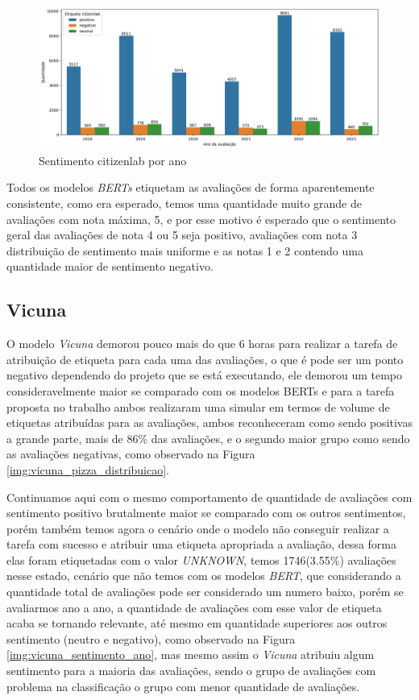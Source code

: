 \begin{figure}
	\centering
	\includegraphics[width=1\textwidth]{figs/bert/classificacao_citizenlab.png}
	\caption{Sentimento citizenlab por ano}
	\label{img:sentimento_citizenlab}
\end{figure}


Todos os modelos \textit{BERTs} etiquetam as avaliações de forma aparentemente consistente, como era esperado, temos uma quantidade muito grande de avaliações com nota máxima, 5, e por esse motivo é esperado que o sentimento geral das avaliações de nota 4 ou 5 seja positivo, avaliações com nota 3 distribuição de sentimento mais uniforme e as notas 1 e 2 contendo uma quantidade maior de sentimento negativo.

\subsection{Vicuna}
\label{sec:resultados:subsec:vicuna}


O modelo \textit{Vicuna} demorou pouco mais do que 6 horas para realizar a tarefa de atribuição de etiqueta para cada uma das avaliações, o que é pode ser um ponto negativo dependendo do projeto que se está executando, ele demorou um tempo consideravelmente maior se comparado com os modelos BERTs e para a tarefa proposta no trabalho ambos realizaram uma simular em termos de volume de etiquetas atribuídas para as avaliações, ambos reconheceram como sendo positivas a grande parte, mais de 86\% das avaliações, e o segundo maior grupo como sendo as avaliações negativas, como observado na Figura \ref{img:vicuna_pizza_distribuicao}.

Continuamos aqui com o mesmo comportamento de quantidade de avaliações com sentimento positivo brutalmente maior se comparado com os outros sentimentos, porém também temos agora o cenário onde o modelo não conseguir realizar a tarefa com sucesso e atribuir uma etiqueta apropriada a avaliação, dessa forma elas foram etiquetadas com o valor \textit{UNKNOWN}, temos 1746(3.55\%) avaliações nesse estado, cenário que não temos com os modelos \textit{BERT}, que considerando a quantidade total de avaliações pode ser considerado um numero baixo, porém se avaliarmos ano a ano, a quantidade de avaliações com esse valor de etiqueta acaba se tornando relevante, até mesmo em quantidade superiores aos outros sentimento (neutro e negativo), como observado na Figura \ref{img:vicuna_sentimento_ano}, mas mesmo assim o \textit{Vicuna} atribuiu algum sentimento para a maioria das avaliações, sendo o grupo de avaliações com problema na classificação o grupo com menor quantidade de avaliações.

